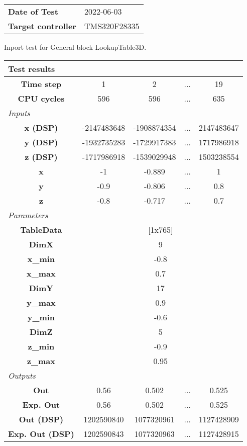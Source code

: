 \begin{tabular}{l l}
\textbf{Date of Test} & 2022-06-03 \tabularnewline
\textbf{Target controller} & TMS320F28335 \tabularnewline
\end{tabular}
\vspace{1ex}
Inport test for General block LookupTable3D.

\vspace{1em}
\begin{tabularx}{\textwidth}{|c|c|c|>{\centering\arraybackslash}X|c|}
\hline
\multicolumn{5}{|l|}{\cellcolor[gray]{0.8}\textbf{Test results}} \tabularnewline \hline
\textbf{Time step} & 1 & 2 & ... & 19 \tabularnewline \hline
\textbf{CPU cycles} & 596 & 596 & ... & 635 \tabularnewline \hline
\multicolumn{5}{|l|}{\cellcolor[gray]{0.9}\textit{Inputs}} \tabularnewline \hline
\textbf{x (DSP)} & -2147483648 & -1908874354 & ... & 2147483647 \tabularnewline \hline
\textbf{y (DSP)} & -1932735283 & -1729917383 & ... & 1717986918 \tabularnewline \hline
\textbf{z (DSP)} & -1717986918 & -1539029948 & ... & 1503238554 \tabularnewline \hline
\textbf{x} & -1 & -0.889 & ... & 1 \tabularnewline \hline
\textbf{y} & -0.9 & -0.806 & ... & 0.8 \tabularnewline \hline
\textbf{z} & -0.8 & -0.717 & ... & 0.7 \tabularnewline \hline
\multicolumn{5}{|l|}{\cellcolor[gray]{0.9}\textit{Parameters}} \tabularnewline \hline
\textbf{TableData} & \multicolumn{4}{c|}{[1x765]} \tabularnewline \hline
\textbf{DimX} & \multicolumn{4}{c|}{9} \tabularnewline \hline
\textbf{x\_min} & \multicolumn{4}{c|}{-0.8} \tabularnewline \hline
\textbf{x\_max} & \multicolumn{4}{c|}{0.7} \tabularnewline \hline
\textbf{DimY} & \multicolumn{4}{c|}{17} \tabularnewline \hline
\textbf{y\_max} & \multicolumn{4}{c|}{0.9} \tabularnewline \hline
\textbf{y\_min} & \multicolumn{4}{c|}{-0.6} \tabularnewline \hline
\textbf{DimZ} & \multicolumn{4}{c|}{5} \tabularnewline \hline
\textbf{z\_min} & \multicolumn{4}{c|}{-0.9} \tabularnewline \hline
\textbf{z\_max} & \multicolumn{4}{c|}{0.95} \tabularnewline \hline
\multicolumn{5}{|l|}{\cellcolor[gray]{0.9}\textit{Outputs}} \tabularnewline \hline
\textbf{Out} & 0.56 & 0.502 & ... & 0.525 \tabularnewline \hline
\textbf{Exp. Out} & 0.56 & 0.502 & ... & 0.525 \tabularnewline \hline
\textbf{Out (DSP)} & 1202590840 & 1077320961 & ... & 1127428909 \tabularnewline \hline
\textbf{Exp. Out (DSP)} & 1202590843 & 1077320963 & ... & 1127428915 \tabularnewline \hline
\end{tabularx}
\vspace{1ex}

